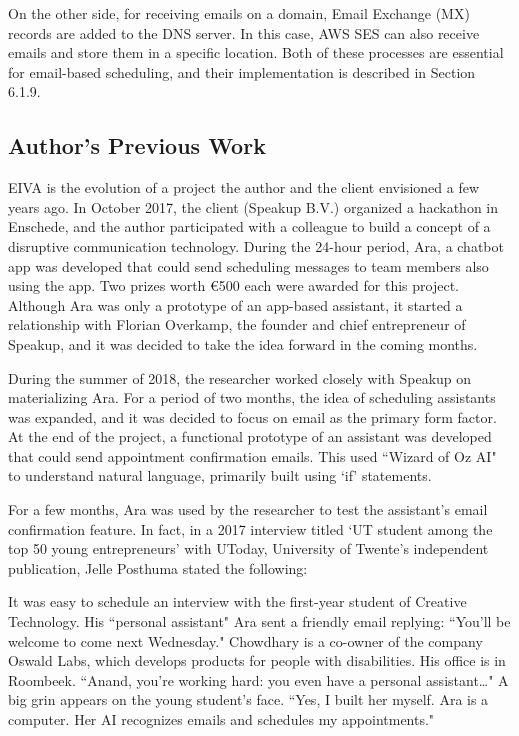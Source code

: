 \documentclass{article}
\begin{document}
On the other side, for receiving emails on a domain, Email Exchange (MX) records are added to the DNS server. In this case, AWS SES can also receive emails and store them in a specific location. Both of these processes are essential for email-based scheduling, and their implementation is described in Section 6.1.9.

\subsection{Author's Previous Work}

EIVA is the evolution of a project the author and the client envisioned a few years ago. In October 2017, the client (Speakup B.V.) organized a hackathon in Enschede, and the author participated with a colleague to build a concept of a disruptive communication technology. During the 24-hour period, Ara, a chatbot app was developed that could send scheduling messages to team members also using the app. Two prizes worth €500 each were awarded for this project. Although Ara was only a prototype of an app-based assistant, it started a relationship with Florian Overkamp, the founder and chief entrepreneur of Speakup, and it was decided to take the idea forward in the coming months.

During the summer of 2018, the researcher worked closely with Speakup on materializing Ara. For a period of two months, the idea of scheduling assistants was expanded, and it was decided to focus on email as the primary form factor. At the end of the project, a functional prototype of an assistant was developed that could send appointment confirmation emails. This used ``Wizard of Oz AI" to understand natural language, primarily built using `if' statements.

For a few months, Ara was used by the researcher to test the assistant's email confirmation feature. In fact, in a 2017 interview titled `UT student among the top 50 young entrepreneurs' with UToday, University of Twente's independent publication, Jelle Posthuma stated the following:

\begin{displayquote}
	It was easy to schedule an interview with the first-year student of Creative Technology. His ``personal assistant" Ara sent a friendly email replying: ``You’ll be welcome to come next Wednesday." Chowdhary is a co-owner of the company Oswald Labs, which develops products for people with disabilities. His office is in Roombeek. ``Anand, you’re working hard: you even have a personal assistant…" A big grin appears on the young student’s face. ``Yes, I built her myself. Ara is a computer. Her AI recognizes emails and schedules my appointments." \cite{noauthor_ut_nodate}
\end{displayquote}
\end{document}
